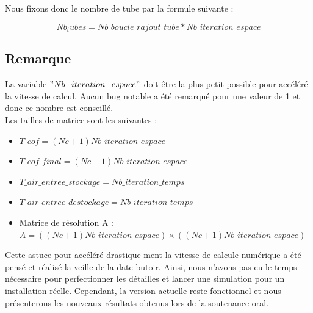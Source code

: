 Nous fixons donc le nombre de tube par la formule suivante :

\begin{equation}
Nb_tubes=Nb\_boucle\_rajout\_tube * Nb\_iteration\_espace
\end{equation}

\subsection{Remarque}

La variable $"Nb\_iteration\_espace"$ doit être la plus petit possible pour accéléré la vitesse de calcul. Aucun bug notable a été remarqué pour une valeur de 1 et donc ce nombre est conseillé. \\
 
Les tailles de matrice sont les suivantes : 
\begin{itemize}
\item $T\_cof = (Nc+1)Nb\_iteration\_espace$
\item $T\_cof\_final = (Nc+1)Nb\_iteration\_espace$
\item $T\_air\_entree\_stockage = Nb\_iteration\_temps$
\item $T\_air\_entree\_destockage = Nb\_iteration\_temps$
\item Matrice de résolution A : $A = ((Nc+1)Nb\_iteration\_espace) \times ((Nc+1)Nb\_iteration\_espace)$\\

\end{itemize}


Cette astuce pour accéléré drastique-ment la vitesse de calcule numérique a été pensé et réalisé la veille de la date butoir. 
Ainsi, nous n'avons pas eu le temps nécessaire pour perfectionner les détailles et lancer une simulation pour un installation réelle. Cependant, la version actuelle reste fonctionnel et nous présenterons les nouveaux résultats obtenus lors de la soutenance oral.


